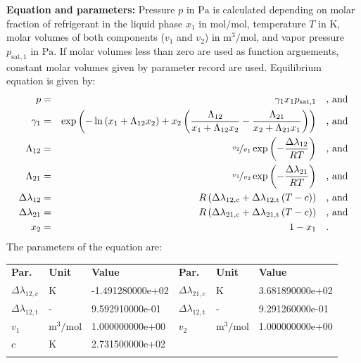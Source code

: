 \textbf{Equation and parameters:}
\newline
%
Pressure $p$ in $\si{\pascal}$ is calculated depending on molar fraction of refrigerant in the liquid phase $x_1$ in $\si{\mole\per\mole}$, temperature $T$ in $\si{\kelvin}$, molar volumes of both components ($v_1$ and $v_2$) in $\si{\cubic\meter\per\mole}$, and vapor pressure $p_\mathrm{sat,1}$ in $\si{\pascal}$. If molar volumes less than zero are used as function arguements, constant molar volumes given by parameter record are used. Equilibrium equation is given by:
%
\begin{equation*}
\begin{split}
p &=& \gamma_1 x_1 p_\mathrm{sat,1} & \quad\text{, and} \\
\gamma_1 &=& \exp \left( - \ln \left( x_1 + \Lambda_{12} x_2 \right) + x_2 \left( \frac{\Lambda_{12}}{x_1 + \Lambda_{12} x_2} - \frac{\Lambda_{21}}{x_2 + \Lambda_{21} x_1} \right) \right) & \quad\text{, and} \\
\Lambda_{12} &=& \nicefrac{v_2}{v_1} \exp \left( - \frac{\Delta\lambda_{12}}{R T} \right) & \quad\text{, and} \\
\Lambda_{21} &=& \nicefrac{v_1}{v_2} \exp \left( - \frac{\Delta\lambda_{21}}{R T} \right) & \quad\text{, and} \\
\Delta\lambda_{12} &=& R \left( \Delta\lambda_\mathrm{12,c} + \Delta\lambda_\mathrm{12,t} \left( T - c \right) \right) & \quad\text{, and} \\
\Delta\lambda_{21} &=& R \left( \Delta\lambda_\mathrm{21,c} + \Delta\lambda_\mathrm{21,t} \left( T - c \right) \right) & \quad\text{, and} \\
x_2 &=& 1 - x_1  & \quad\text{.} \\
\end{split}
\end{equation*}
%
The parameters of the equation are:
%
\begin{longtable}[l]{lll|lll}
\toprule
\addlinespace
\textbf{Par.} & \textbf{Unit} & \textbf{Value} &	\textbf{Par.} & \textbf{Unit} & \textbf{Value} \\
\addlinespace
\midrule
\endhead

\bottomrule
\endfoot
\bottomrule
\endlastfoot
\addlinespace

$\Delta\lambda_\mathrm{12,c}$ & $\si{\kelvin}$ & -1.491280000e+02 & $\Delta\lambda_\mathrm{21,c}$ & $\si{\kelvin}$ & 3.681890000e+02 \\
$\Delta\lambda_\mathrm{12,t}$ & - & 9.592910000e-01 & $\Delta\lambda_\mathrm{12,t}$ & - & 9.291260000e-01 \\
$v_1$ & $\si{\cubic\meter\per\mole}$ & 1.000000000e+00 & $v_2$ & $\si{\cubic\meter\per\mole}$ & 1.000000000e+00 \\
$c$ & $\si{\kelvin}$ & 2.731500000e+02 & & & \\

\addlinespace\end{longtable}

